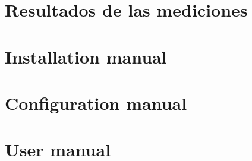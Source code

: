 \section{Resultados de las mediciones}
	\label{anexo:resultados_mediciones}
	

\section{Installation manual}
\label{anexo_manual_instalacion}


\section{Configuration manual}
\label{anexo_manual_configuracion}


\section{User manual}
\label{anexo_manual_usuario}
